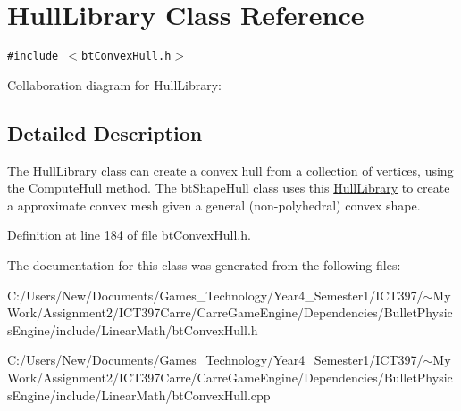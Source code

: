 \hypertarget{class_hull_library}{
\section{HullLibrary Class Reference}
\label{class_hull_library}
}
{\tt \#include $<$btConvexHull.h$>$}

Collaboration diagram for HullLibrary:

\subsection{Detailed Description}
The \hyperlink{class_hull_library}{HullLibrary} class can create a convex hull from a collection of vertices, using the ComputeHull method. The btShapeHull class uses this \hyperlink{class_hull_library}{HullLibrary} to create a approximate convex mesh given a general (non-polyhedral) convex shape. 

Definition at line 184 of file btConvexHull.h.

The documentation for this class was generated from the following files:\begin{CompactItemize}
\item 
C:/Users/New/Documents/Games\_\-Technology/Year4\_\-Semester1/ICT397/$\sim$My Work/Assignment2/ICT397Carre/CarreGameEngine/Dependencies/BulletPhysicsEngine/include/LinearMath/btConvexHull.h\item 
C:/Users/New/Documents/Games\_\-Technology/Year4\_\-Semester1/ICT397/$\sim$My Work/Assignment2/ICT397Carre/CarreGameEngine/Dependencies/BulletPhysicsEngine/include/LinearMath/btConvexHull.cpp\end{CompactItemize}
